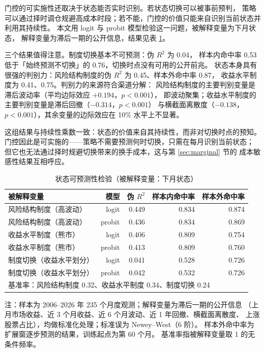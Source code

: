 门控的可实施性还取决于状态能否实时识别。若状态切换可以被事前预判，
策略可以通过择时调仓规避高成本时段；若不能，门控的价值只能来自识别当前状态并利用其持续性。
本文用 logit 与 probit 模型检验这一问题，被解释变量为下月状态，
解释变量为滞后一期的公开信息，结果见表 \ref{tab:logit}。

三个结果值得注意。制度切换基本不可预测：伪 $R^2$ 为 0.04，
样本内命中率 0.53 低于「始终预测不切换」的 0.76，切换时点没有可用的公开前兆。
状态本身具有很强的判别力：风险结构制度的伪 $R^2$ 为 0.45、样本外命中率 0.87，
收益水平制度为 0.41、0.75。判别力的来源符合渠道分解：
风险结构制度的主要判别变量是滞后波动率（平均边际效应 $+0.194$，$p<0.001$），
即波动聚集；收益水平制度的主要判别变量是滞后回撤（$-0.314$，$p<0.001$）
与横截面离散度（$-0.138$，$p<0.001$），其余变量的边际效应在 10\% 水平上不显著。

这组结果与持续性乘数一致：状态的价值来自其持续性，而非对切换时点的预知。
门控因此是可实施的——策略不需要预测何时切换，只需在每月识别当前状态；
但它也无法通过择时规避切换带来的换手成本，这与第 \ref{sec:marginal} 节的
成本敏感性结果互相呼应。

\begin{table}[htbp]
\centering
\caption{状态可预测性检验（被解释变量：下月状态）}
\label{tab:logit}
\begin{threeparttable}
\footnotesize
\begin{tabular}{lrrrr}
\toprule
被解释变量 & 模型 & 伪 $R^2$ & 样本内命中率 & 样本外命中率 \\
\midrule
风险结构制度（高波动） & logit & 0.449 & 0.834 & 0.874 \\
风险结构制度（高波动） & probit & 0.436 & 0.834 & 0.869 \\
收益水平制度（熊市） & logit & 0.406 & 0.809 & 0.754 \\
收益水平制度（熊市） & probit & 0.413 & 0.809 & 0.760 \\
制度切换（收益水平划分） & logit & 0.041 & 0.528 & 0.726 \\
制度切换（收益水平划分） & probit & 0.042 & 0.532 & 0.726 \\
\midrule
\multicolumn{5}{l}{基准率：风险结构制度 0.32、收益水平制度 0.34、制度切换 0.24} \\
\bottomrule
\end{tabular}
\begin{tablenotes}[flushleft]\footnotesize
\item 注：样本为 2006--2026 年 235 个月度观测；解释变量为滞后一期的公开信息
（上月市场收益、近 3 个月收益、近 6 个月波动、近 1 年回撤、横截面离散度、
上涨股票占比），均做标准化处理；标准误为 Newey--West（6 阶）。
样本外命中率为扩展窗逐步预测的结果，训练起点为第 60 个月。
基准率指被解释变量取 1 的无条件频率。
\end{tablenotes}
\end{threeparttable}
\end{table}

